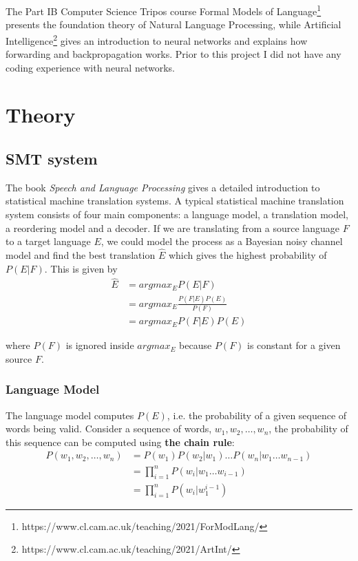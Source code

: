 \documentclass[12pt,a4paper,twoside,openright]{report}
\begin{document}
The Part IB Computer Science Tripos course Formal Models of Language\footnote{https://www.cl.cam.ac.uk/teaching/2021/ForModLang/} presents the foundation theory of Natural Language Processing, while Artificial Intelligence\footnote{https://www.cl.cam.ac.uk/teaching/2021/ArtInt/} gives an introduction to neural networks and explains how forwarding and backpropagation works. Prior to this project I did not have any coding experience with neural networks.

\section{Theory}\label{section:theory}

\subsection{SMT system}\label{section:SMT_system}
The book \textit{Speech and Language Processing}\cite{Jurafsky:2009:SLP:1214993} gives a detailed introduction to statistical machine translation systems. A typical statistical machine translation system consists of four main components: a language model, a translation model, a reordering model and a decoder. If we are translating from a source language $F$ to a target language $E$, we could model the process as a Bayesian noisy channel model and find the best translation $\hat{E}$ which gives the highest probability of $P(E|F)$. This is given by
\begin{equation*}
    \begin{split}
        \hat{E} & = argmax_E P(E|F)\\
         & = argmax_E \frac{P(F|E)P(E)}{P(F)}\\
         & = argmax_E P(F|E)P(E)
    \end{split}
\end{equation*}

where $P(F)$ is ignored inside $argmax_E$ because $P(F)$ is constant for a given source $F$.

\subsubsection{Language Model}
The language model computes $P(E)$, i.e. the probability of a given sequence of words being valid. Consider a sequence of words, $w_1, w_2, \dots, w_n$, the probability of this sequence can be computed using \textbf{the chain rule}:
\begin{equation*}
\begin{split}
P(w_1, w_2, \dots, w_n) & = P(w_1)P(w_2|w_1)\dots P(w_n|w_1\dots w_{n-1})\\
 & = \prod_{i=1}^{n}P(w_i|w_1\dots w_{i-1})\\
 & = \prod_{i=1}^{n}P(w_i|w_1^{i-1})
\end{split}
\end{equation*}
\end{document}
